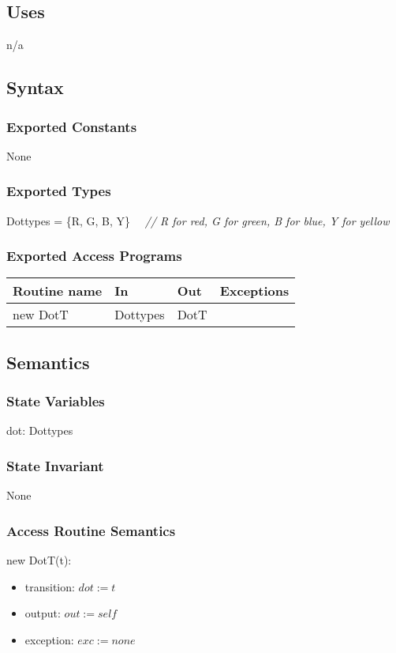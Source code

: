 \documentclass[12pt]{article}
\begin{document}
\subsection* {Uses}
n/a


\subsection* {Syntax}
\subsubsection* {Exported Constants}
None

\subsubsection* {Exported Types}
Dottypes = \{R, G, B, Y\}
\ \ \textit{// R for red, G for green, B for blue, Y for yellow}

\subsubsection* {Exported Access Programs}
\begin{tabular}{| l | l | l | l |}
\hline
\textbf{Routine name} & \textbf{In} & \textbf{Out} & \textbf{Exceptions}\\
\hline
new DotT & Dottypes & DotT & \\
\hline
\end{tabular}


\subsection* {Semantics}
\subsubsection* {State Variables}
dot: Dottypes

\subsubsection* {State Invariant}
None

\subsubsection* {Access Routine Semantics}
\noindent new DotT(t):
\begin{itemize}
    \item transition: $dot := t$
    \item output: $out := self$
    \item exception: $exc := none$
\end{itemize}
\end{document}
